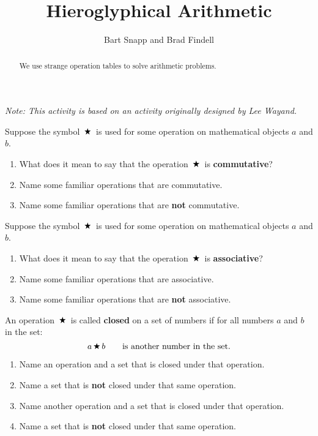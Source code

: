\documentclass[nooutcomes,instructornotes]{ximera}
\title{Hieroglyphical Arithmetic}
\author{Bart Snapp and Brad Findell}
\begin{document}
\begin{abstract}
    We use strange operation tables to solve arithmetic
    problems.
\end{abstract}
\maketitle

\label{A:HAr}
\emph{Note: This activity is based on an activity originally designed by Lee Wayand.}

\begin{problem}
Suppose the symbol $\,\text{\ding{72}}\,$ is used for some operation on mathematical objects $a$ and $b$.  
\begin{enumerate}
\item What does it mean to say that the operation $\,\text{\ding{72}}\,$ is \textbf{commutative}?
\item Name some familiar operations that are commutative. 
\item Name some familiar operations that are \textbf{not} commutative. 
\end{enumerate}
\end{problem}


\begin{problem}
Suppose the symbol $\,\text{\ding{72}}\,$ is used for some operation on mathematical objects $a$ and $b$.  
\begin{enumerate}
\item What does it mean to say that the operation $\,\text{\ding{72}}\,$ is \textbf{associative}?
\item Name some familiar operations that are associative. 
\item Name some familiar operations that are \textbf{not} associative. 
\end{enumerate}
\end{problem}

\begin{problem}
An operation $\,\text{\ding{72}}\,$ is called \textbf{closed} on a set of numbers if for all
numbers $a$ and $b$ in the set:
\[
a \,\text{\ding{72}}\, b \qquad \textrm{is another number in the set}.  
\]
\begin{enumerate}
\item Name an operation and a set that is closed under that operation.  
\item Name a set that is \textbf{not} closed under that same operation.  
\item Name another operation and a set that is closed under that operation. 
\item Name a set that is \textbf{not} closed under that same operation.  
\end{enumerate}
\end{problem}
\end{document}

